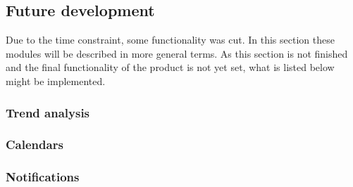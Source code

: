 \documentclass{article}
\begin{document}
\subsection{Future development}
Due to the time constraint, some functionality was cut. In this section these modules will be described in more general terms. As this section is not finished and the final functionality of the product is not yet set, what is listed below might be implemented.
\subsubsection{Trend analysis}
\subsubsection{Calendars}
\subsubsection{Notifications}
\end{document}
